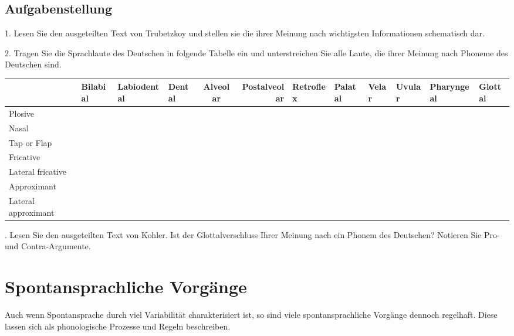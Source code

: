 \documentclass[11pt]{book}
\begin{document}
\newpage
\section{Aufgabenstellung}

1.	Lesen Sie den ausgeteilten Text von Trubetzkoy und stellen sie die ihrer Meinung nach wichtigsten Informationen schematisch dar.\vspace{\fill}


2.	Tragen Sie die Sprachlaute des Deutschen in folgende Tabelle ein und unterstreichen Sie alle Laute, die ihrer Meinung nach Phoneme des Deutschen sind.

\begin{table}\centering
\small
\begin{tabular}{|l|l|l|lcr|l|l|l|l|l|l|}  \hline
 & Bilabial & Labiodental & Dental & Alveolar & Postalveolar & Retroflex & Palatal & Velar & Uvular & Pharyngeal & Glottal\\ \hline
Plosive	&	&	&	&	&	&	&	&	&	&	& \\ \hline
Nasal	&	&	&	&	&	&	&	&	&	&	& \\ \hline
Tap or Flap	&	&	&	&	&	&	&	&	&	&	& \\ \hline
Fricative	&	&	&	&	&	&	&	&	& 	&	& \\ \hline
Lateral fricative	&	&	&	&	&	&	&	&	&	&	& \\ \hline
Approximant	&	&	&	&	&	&	&	&	&	&	& \\ \hline
Lateral approximant	&	&	&	&	&	&	&	&	&	&	& \\ \hline


\end{tabular}
\end{table}

.	Lesen Sie den ausgeteilten Text von Kohler. Ist der Glottalverschluss Ihrer Meinung nach ein Phonem des Deutschen? Notieren Sie Pro- und Contra-Argumente. \vspace{5cm}\\







\chapter{Spontansprachliche Vorgänge}

Auch wenn Spontansprache durch viel Variabilität charakterisiert ist, so sind viele spontansprachliche Vorgänge dennoch regelhaft. Diese lassen sich als phonologische Prozesse und Regeln beschreiben.
\end{document}

